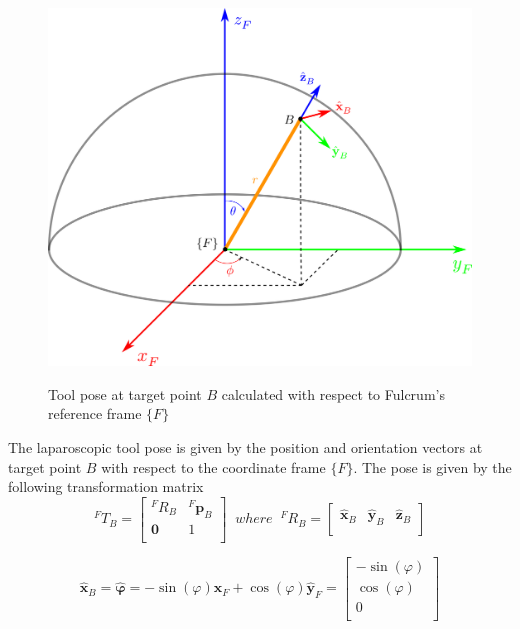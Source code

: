 \begin{center}
\begin{figure}[htbp]
\centering
\includegraphics[width=12cm]{images/fulcrum-space.png}\\
\caption{Tool pose at target point $B$ calculated with respect to Fulcrum's reference frame $\lbrace F \rbrace$}
\end{figure}
\end{center}

The laparoscopic tool pose is given by the position and orientation vectors at target point $B$ with respect to the coordinate frame $\lbrace F \rbrace$.
The pose is given by the following transformation matrix
\[
{}^{F}T_B = \begin{bmatrix}
{}^{F}R_B & {}^{F}\mathbf{p}^{}_B \\
\mathbf{0} & 1 \\
\end{bmatrix}
\;\; where \;\;
{}^{F}R_B = \begin{bmatrix}
\hat{\mathbf{x}}^{}_B & \hat{\mathbf{y}}^{}_B & \hat{\mathbf{z}}^{}_B \\
\end{bmatrix}
\]

\begin{equation}
\hat{\mathbf{x}}^{}_B = \hat{\mathbf{φ}} = -\sin(φ)\hat{\mathbf{x}}^{}_F + \cos(φ)\hat{\mathbf{y}}^{}_F
= \begin{bmatrix}
-\sin(φ) \\
\cos(φ) \\
0 \\
\end{bmatrix}
\end{equation}

